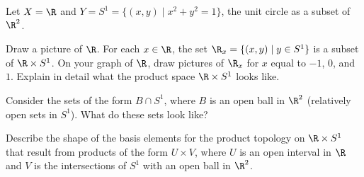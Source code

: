 \begin{activity} Let $X = \R$ and $Y = S^1 = \{(x,y) \mid x^2 + y^2 = 1\}$, the unit circle as a subset of $\R^2$.  
\ba
\item Draw a picture of $\R$. For each $x \in \R$, the set $\R_x = \{(x, y) \mid y \in S^1\}$ is a subset of $\R \times S^1$. On your graph of $\R$, draw pictures of $\R_x$ for $x$ equal to $-1$, $0$, and $1$. Explain in detail what the product space $\R \times S^1$ looks like. 

\item Consider the sets of the form $B \cap S^1$, where $B$ is an open ball in $\R^2$ (relatively open sets in $S^1$). What do these sets look like?

\item Describe the shape of the basis elements for the product topology on $\R \times S^1$ that result from products of the form $U \times V$, where $U$ is an open interval in $\R$ and $V$ is the intersections of $S^1$ with an open ball in $\R^2$. 

\ea

\end{activity}

